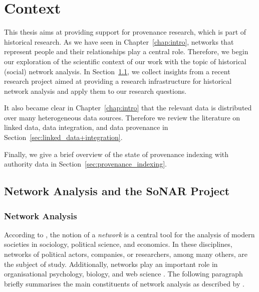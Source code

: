 \chapter{Context}
\label{chap:rel_work}
\label{chap:context}

This thesis aims at providing support for provenance research, which is part of historical research.
As we have seen in Chapter~\ref{chap:intro}, networks that represent
people and their relationships play a central role.
Therefore, we begin our exploration of the scientific context of our work
with the topic of historical (social) network analysis.
In Section~\ref{sec:HNA+SoNAR}, we collect insights from a recent research project
aimed at providing a research infrastructure for historical network analysis
and apply them to our research questions.

It also became clear in Chapter~\ref{chap:intro} that the relevant data is distributed 
over many heterogeneous data sources.
Therefore we review 
the literature on linked data, data integration,
and data provenance in Section~\ref{sec:linked_data+integration}.

Finally, we give a brief overview of the state of provenance indexing
with authority data in Section~\ref{sec:provenance_indexing}.

\section{Network Analysis and the SoNAR Project}
\label{sec:HNA+SoNAR}

\subsection{Network Analysis}

According to \textcite{Jansen2003},
the notion of a \emph{network} is a central tool for the analysis
of modern societies in sociology, political science, and economics.
In these disciplines, networks of political actors, companies, or researchers,
among many others, are the subject of study.
Additionally, networks play an important role
in organisational psychology, biology, and web science \autocite{WikiSNAGerman,WikiNetworkAnalysis}.
The following
paragraph briefly summarises the main constituents of network analysis
as described by \textcite{Jansen2003}.

